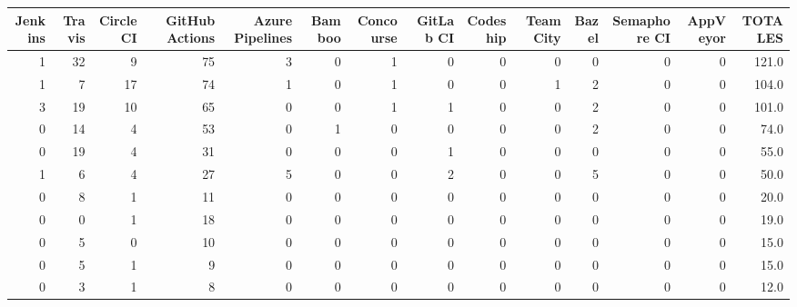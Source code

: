\begin{tabular}{rrrrrrrrrrrrrr}
\toprule
 Jenkins &  Travis &  Circle CI &  GitHub Actions &  Azure Pipelines &  Bamboo &  Concourse &  GitLab CI &  Codeship &  TeamCity &  Bazel &  Semaphore CI &  AppVeyor &  TOTALES \\
\midrule
       1 &      32 &          9 &              75 &                3 &       0 &          1 &          0 &         0 &         0 &      0 &             0 &         0 &    121.0 \\
       1 &       7 &         17 &              74 &                1 &       0 &          1 &          0 &         0 &         1 &      2 &             0 &         0 &    104.0 \\
       3 &      19 &         10 &              65 &                0 &       0 &          1 &          1 &         0 &         0 &      2 &             0 &         0 &    101.0 \\
       0 &      14 &          4 &              53 &                0 &       1 &          0 &          0 &         0 &         0 &      2 &             0 &         0 &     74.0 \\
       0 &      19 &          4 &              31 &                0 &       0 &          0 &          1 &         0 &         0 &      0 &             0 &         0 &     55.0 \\
       1 &       6 &          4 &              27 &                5 &       0 &          0 &          2 &         0 &         0 &      5 &             0 &         0 &     50.0 \\
       0 &       8 &          1 &              11 &                0 &       0 &          0 &          0 &         0 &         0 &      0 &             0 &         0 &     20.0 \\
       0 &       0 &          1 &              18 &                0 &       0 &          0 &          0 &         0 &         0 &      0 &             0 &         0 &     19.0 \\
       0 &       5 &          0 &              10 &                0 &       0 &          0 &          0 &         0 &         0 &      0 &             0 &         0 &     15.0 \\
       0 &       5 &          1 &               9 &                0 &       0 &          0 &          0 &         0 &         0 &      0 &             0 &         0 &     15.0 \\
       0 &       3 &          1 &               8 &                0 &       0 &          0 &          0 &         0 &         0 &      0 &             0 &         0 &     12.0 \\

\end{tabular}
